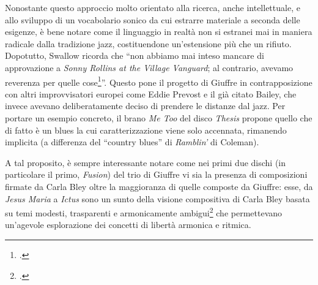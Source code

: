  Nonostante questo approccio molto orientato alla ricerca, anche intellettuale, e allo sviluppo di un vocabolario sonico da cui estrarre materiale a seconda delle esigenze, è bene notare come il linguaggio in realtà non si estranei mai in maniera radicale dalla tradizione jazz, costituendone un'estensione più che un rifiuto. Dopotutto, Swallow ricorda che ``non abbiamo mai inteso mancare di approvazione a \textit{Sonny Rollins at the Village Vanguard}; al contrario, avevamo reverenza per quelle cose\footcite[388]{johnston}''. Questo pone il progetto di Giuffre in contrapposizione con altri improvvisatori europei come Eddie Prevost e il già citato Bailey, che invece avevano deliberatamente deciso di prendere le distanze dal jazz. Per portare un esempio concreto, il brano \textit{Me Too} del disco \textit{Thesis} propone quello che di fatto è un blues la cui caratterizzazione viene solo accennata, rimanendo implicita (a differenza del ``country blues'' di \textit{Ramblin'} di Coleman). \par
 A tal proposito, è sempre interessante notare come nei primi due dischi (in particolare il primo, \textit{Fusion}) del trio di Giuffre vi sia la presenza di composizioni firmate da Carla Bley oltre la maggioranza di quelle composte da Giuffre: esse, da \textit{Jesus Maria} a \textit{Ictus} sono un sunto della visione compositiva di Carla Bley basata su temi modesti, trasparenti e armonicamente ambigui\footcite[25]{carla} che permettevano un'agevole esplorazione dei concetti di libertà armonica e ritmica.

\appendix
{}



